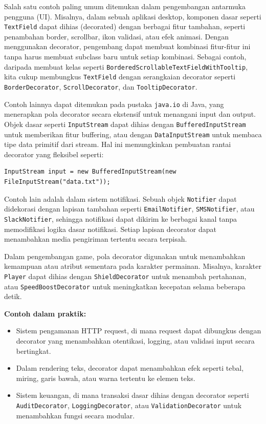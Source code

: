Salah satu contoh paling umum ditemukan dalam pengembangan antarmuka pengguna (UI). Misalnya, dalam sebuah aplikasi desktop, komponen dasar seperti \texttt{TextField} dapat dihias (decorated) dengan berbagai fitur tambahan, seperti penambahan border, scrollbar, ikon validasi, atau efek animasi. Dengan menggunakan decorator, pengembang dapat membuat kombinasi fitur-fitur ini tanpa harus membuat subclass baru untuk setiap kombinasi. Sebagai contoh, daripada membuat kelas seperti \texttt{BorderedScrollableTextFieldWithTooltip}, kita cukup membungkus \texttt{TextField} dengan serangkaian decorator seperti \texttt{BorderDecorator}, \texttt{ScrollDecorator}, dan \texttt{TooltipDecorator}.

Contoh lainnya dapat ditemukan pada pustaka \texttt{java.io} di Java, yang menerapkan pola decorator secara ekstensif untuk menangani input dan output. Objek dasar seperti \texttt{InputStream} dapat dihias dengan \texttt{BufferedInputStream} untuk memberikan fitur buffering, atau dengan \texttt{DataInputStream} untuk membaca tipe data primitif dari stream. Hal ini memungkinkan pembuatan rantai decorator yang fleksibel seperti:

\begin{lstlisting}[style=JavaStyle]
	InputStream input = new BufferedInputStream(new FileInputStream("data.txt"));
\end{lstlisting}

Contoh lain adalah dalam sistem notifikasi. Sebuah objek \texttt{Notifier} dapat didekorasi dengan lapisan tambahan seperti \texttt{EmailNotifier}, \texttt{SMSNotifier}, atau \texttt{SlackNotifier}, sehingga notifikasi dapat dikirim ke berbagai kanal tanpa memodifikasi logika dasar notifikasi. Setiap lapisan decorator dapat menambahkan media pengiriman tertentu secara terpisah.

Dalam pengembangan game, pola decorator digunakan untuk menambahkan kemampuan atau atribut sementara pada karakter permainan. Misalnya, karakter \texttt{Player} dapat dihias dengan \texttt{ShieldDecorator} untuk menambah pertahanan, atau \texttt{SpeedBoostDecorator} untuk meningkatkan kecepatan selama beberapa detik.

\textbf{Contoh dalam praktik:}
\begin{itemize}
	\item Sistem pengamanan HTTP request, di mana request dapat dibungkus dengan decorator yang menambahkan otentikasi, logging, atau validasi input secara bertingkat.
	\item Dalam rendering teks, decorator dapat menambahkan efek seperti tebal, miring, garis bawah, atau warna tertentu ke elemen teks.
	\item Sistem keuangan, di mana transaksi dasar dihias dengan decorator seperti \texttt{AuditDecorator}, \texttt{LoggingDecorator}, atau \texttt{ValidationDecorator} untuk menambahkan fungsi secara modular.
\end{itemize}

